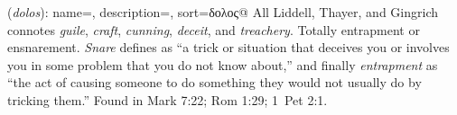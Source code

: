 \item[Ensnaring,]

(\textit{dolos}):
{
    name=,
    description={},
    sort=δολος@
}
All Liddell, Thayer, and Gingrich connotes \emph{guile}, \emph{craft}, \emph{cunning}, \emph{deceit}, and \emph{treachery}. Totally entrapment or ensnarement. \emph{Snare} defines as ``a trick or situation that deceives you or involves you in some problem that you do not know about,'' and finally \emph{entrapment} as ``the act of causing someone to do something they would not usually do by tricking them.''
Found in Mark 7:22; Rom 1:29; 1~Pet 2:1.
